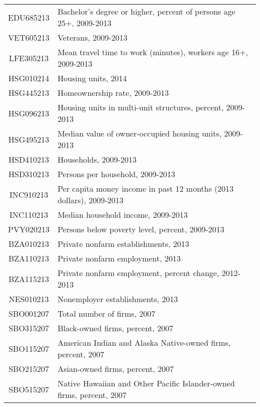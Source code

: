 {\begin{tabularx}{\linewidth}[H]{@{}cX@{}}
	EDU685213 & Bachelor's degree or higher, percent of persons age 25+, 2009-2013     \\
	VET605213 & Veterans, 2009-2013                                                    \\
	LFE305213 & Mean travel time to work (minutes), workers age 16+, 2009-2013         \\
	HSG010214 & Housing units, 2014                                                    \\
	HSG445213 & Homeownership rate, 2009-2013                                          \\
	HSG096213 & Housing units in multi-unit structures, percent, 2009-2013             \\
	HSG495213 & Median value of owner-occupied housing units, 2009-2013                \\
	HSD410213 & Households, 2009-2013                                                  \\
	HSD310213 & Persons per household, 2009-2013                                       \\
	INC910213 & Per capita money income in past 12 months (2013 dollars), 2009-2013    \\
	INC110213 & Median household income, 2009-2013                                     \\
	PVY020213 & Persons below poverty level, percent, 2009-2013                        \\
	BZA010213 & Private nonfarm establishments, 2013                                   \\
	BZA110213 & Private nonfarm employment,  2013                                      \\
	BZA115213 & Private nonfarm employment, percent change, 2012-2013                  \\
	NES010213 & Nonemployer establishments, 2013                                       \\
	SBO001207 & Total number of firms, 2007                                            \\
	SBO315207 & Black-owned firms, percent, 2007                                       \\
	SBO115207 & American Indian and Alaska Native-owned firms, percent, 2007          \\
	SBO215207 & Asian-owned firms, percent, 2007                                       \\
	SBO515207 & Native Hawaiian and Other Pacific Islander-owned firms, percent, 2007 \\

\end{tabularx}}
